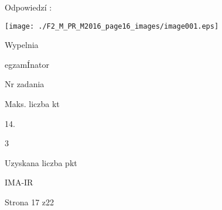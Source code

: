 \documentclass[a4paper,12pt]{article}
\begin{document}
Odpowiedzí :
\begin{center}
\texttt{[image: ./F2\_M\_PR\_M2016\_page16\_images/image001.eps]}
\end{center}
Wypelnia

egzamÍnator

Nr zadania

Maks. liczba kt

14.

3

Uzyskana liczba pkt

IMA-IR

Strona 17 z22
\end{document}
